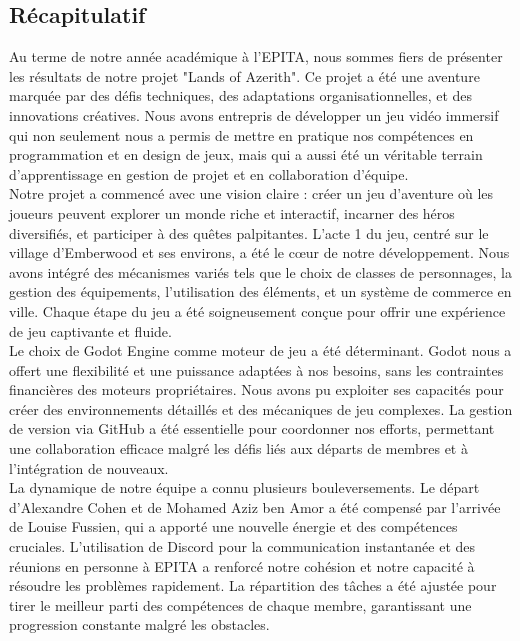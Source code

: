 \subsection{Récapitulatif}
Au terme de notre année académique à l'EPITA, nous sommes fiers de présenter les résultats de notre projet "Lands of Azerith". 
Ce projet a été une aventure marquée par des défis techniques, des adaptations organisationnelles, et des innovations créatives. 
Nous avons entrepris de développer un jeu vidéo immersif qui non seulement nous a permis de mettre en pratique nos compétences en programmation et en design de jeux, 
mais qui a aussi été un véritable terrain d'apprentissage en gestion de projet et en collaboration d'équipe. 
\\

Notre projet a commencé avec une vision claire : créer un jeu d'aventure où les joueurs peuvent explorer un monde riche et interactif, 
incarner des héros diversifiés, et participer à des quêtes palpitantes. L'acte 1 du jeu, centré sur le village d'Emberwood et ses environs, 
a été le cœur de notre développement. Nous avons intégré des mécanismes variés tels que le choix de classes de personnages, la gestion des équipements, 
l'utilisation des éléments, et un système de commerce en ville. Chaque étape du jeu a été soigneusement conçue pour offrir une expérience de jeu captivante et fluide. 
\\

Le choix de Godot Engine comme moteur de jeu a été déterminant. Godot nous a offert une flexibilité et une puissance adaptées à nos besoins, 
sans les contraintes financières des moteurs propriétaires. Nous avons pu exploiter ses capacités pour créer des environnements détaillés et
 des mécaniques de jeu complexes. La gestion de version via GitHub a été essentielle pour coordonner nos efforts, permettant une collaboration 
 efficace malgré les défis liés aux départs de membres et à l'intégration de nouveaux. 
\\

La dynamique de notre équipe a connu plusieurs bouleversements.
Le départ d'Alexandre Cohen et de Mohamed Aziz ben Amor a été compensé par l'arrivée de Louise Fussien,
 qui a apporté une nouvelle énergie et des compétences cruciales. L'utilisation de Discord pour la communication instantanée 
 et des réunions en personne à EPITA a renforcé notre cohésion et notre capacité à résoudre les problèmes rapidement. 
 La répartition des tâches a été ajustée pour tirer le meilleur parti des compétences de chaque membre, garantissant une progression constante malgré les obstacles. 
\\

